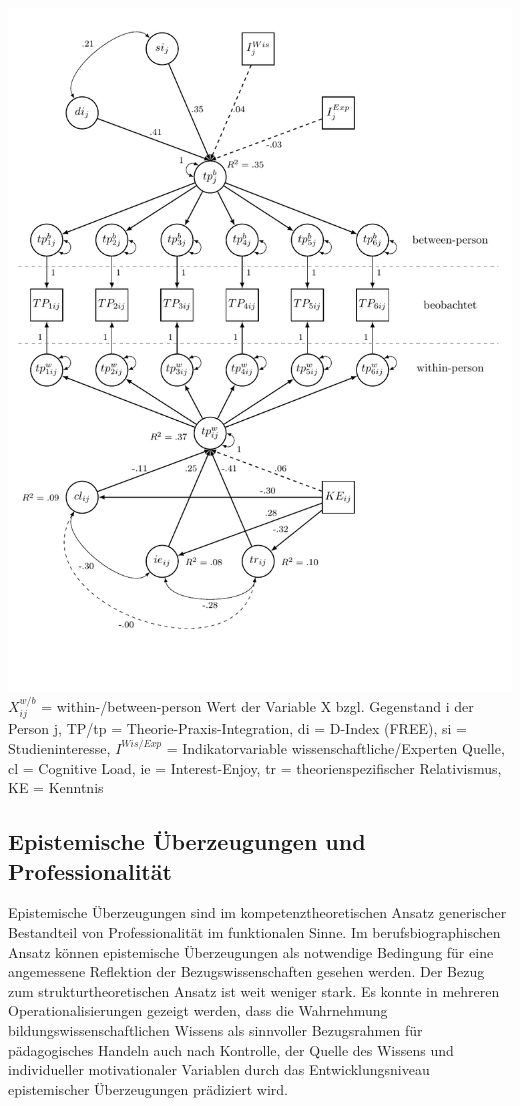 \documentclass[]{tufte-handout}
\begin{document}
\begin{marginfigure}
\includegraphics{../Img/mind_the_gap_mlsem.pdf} \(X_{ij}^{w/b}\) =
within-/between-person Wert der Variable X bzgl. Gegenstand i der Person
j, TP/tp = Theorie-Praxis-Integration, di = D-Index (FREE), si =
Studieninteresse, \(I^{Wis/Exp}\) = Indikatorvariable
wissenschaftliche/Experten Quelle, cl = Cognitive Load, ie =
Interest-Enjoy, tr = theorienspezifischer Relativismus, KE = Kenntnis
\end{marginfigure}

\subsection{Epistemische Überzeugungen und
Professionalität}\label{epistemische-uberzeugungen-und-professionalitat}

Epistemische Überzeugungen sind im kompetenztheoretischen Ansatz
generischer Bestandteil von Professionalität im funktionalen Sinne. Im
berufsbiographischen Ansatz können epistemische Überzeugungen als
notwendige Bedingung für eine angemessene Reflektion der
Bezugswissenschaften gesehen werden. Der Bezug zum strukturtheoretischen
Ansatz ist weit weniger stark. Es konnte in mehreren
Operationalisierungen gezeigt werden, dass die Wahrnehmung
bildungswissenschaftlichen Wissens als sinnvoller Bezugsrahmen für
pädagogisches Handeln auch nach Kontrolle, der Quelle des Wissens und
individueller motivationaler Variablen durch das Entwicklungsniveau
epistemischer Überzeugungen prädiziert wird.
\end{document}
